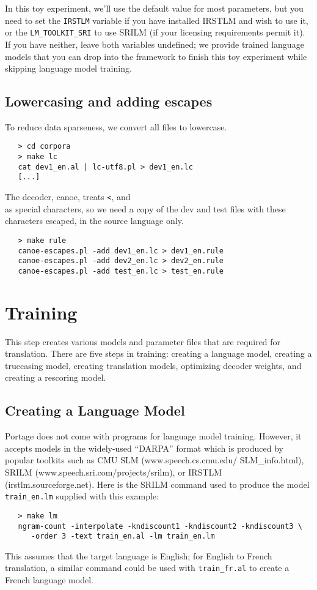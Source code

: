 \documentclass[11pt]{article}
\begin{document}
In this toy experiment, we'll use the default value for most parameters, but
you need to set the \texttt{IRSTLM} variable if you have installed IRSTLM and
wish to use it, or the \texttt{LM\_TOOLKIT\_SRI} to use SRILM (if your
licensing requirements permit it).  If you have neither, leave both variables
undefined; we provide trained language models that you can drop into the
framework to finish this toy experiment while skipping language model training.

\subsection{Lowercasing and adding escapes}

To reduce data sparseness, we convert all files to lowercase.
\begin{verbatim}
   > cd corpora
   > make lc
   cat dev1_en.al | lc-utf8.pl > dev1_en.lc
   [...]
\end{verbatim}

The decoder, canoe, treats \texttt{<}, \testtt{>} and \texttt{\\} as special
characters, so we need a copy of the dev and test files with these characters
escaped, in the source language only.

\begin{verbatim}
   > make rule
   canoe-escapes.pl -add dev1_en.lc > dev1_en.rule
   canoe-escapes.pl -add dev2_en.lc > dev2_en.rule
   canoe-escapes.pl -add test_en.lc > test_en.rule
\end{verbatim}



\section{Training} \label{Training}

This step creates various models and parameter files that are required for
translation. There are five steps in training: creating a language model,
creating a truecasing model, creating translation models, optimizing decoder
weights, and creating a rescoring model.

\subsection{Creating a Language Model} \label{LM}

Portage does not come with programs for language model training. However,
it accepts models in the widely-used ``DARPA'' format which is produced by popular
toolkits such as CMU SLM (www.speech.cs.cmu.edu/ SLM\_info.html), SRILM
(www.speech.sri.com/projects/srilm), or IRSTLM (irstlm.sourceforge.net). Here
is the SRILM command used to produce the model {\tt train\_en.lm} supplied with
this example:
\begin{verbatim}
   > make lm
   ngram-count -interpolate -kndiscount1 -kndiscount2 -kndiscount3 \
      -order 3 -text train_en.al -lm train_en.lm
\end{verbatim}
This assumes that the target language is English; for English to French
translation, a similar command could be used with {\tt train\_fr.al} to create
a French language model.
\end{document}
